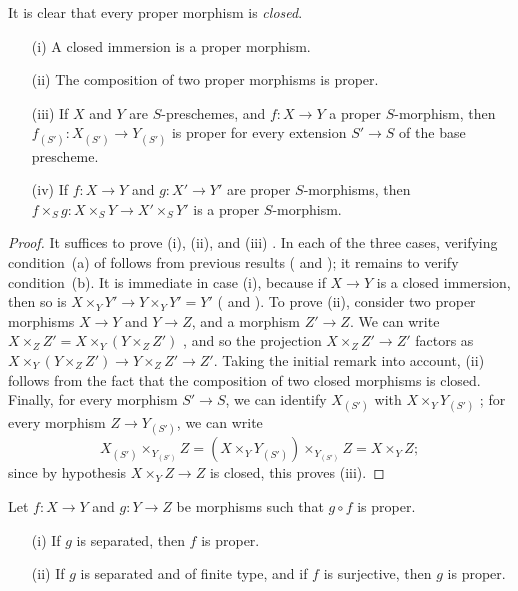 It is clear that every proper morphism is \emph{closed}.

\begin{proposition}[5.4.2]
\label{II.5.4.2}
\medskip\noindent
\begin{enumerate}
  \item[{\rm(i)}] A closed immersion is a proper morphism.
  \item[{\rm(ii)}] The composition of two proper morphisms is proper.
  \item[{\rm(iii)}] If $X$ and $Y$ are $S$-preschemes, and $f:X\to Y$ a proper $S$-morphism, then $f_{(S')}:X_{(S')}\to Y_{(S')}$ is proper for every extension $S'\to S$ of the base prescheme.
  \item[{\rm(iv)}] If $f:X\to Y$ and $g:X'\to Y'$ are proper $S$-morphisms, then $f\times_S g:X\times_S Y\to X'\times_S Y'$ is a proper $S$-morphism.
\end{enumerate}
\end{proposition}

\begin{proof}
It suffices to prove (i), (ii), and (iii) .
In each of the three cases, verifying condition~(a) of  follows from previous results ( and ); it remains to verify condition~(b).
It is immediate in case (i), because if $X\to Y$ is a closed immersion, then so is $X\times_Y Y'\to Y\times_Y Y'=Y'$ ( and ).
To prove (ii), consider two proper morphisms $X\to Y$ and $Y\to Z$, and a morphism $Z'\to Z$.
We can write $X\times_Z Z'=X\times_Y(Y\times_Z Z')$ , and so the projection $X\times_Z Z'\to Z'$ factors as $X\times_Y(Y\times_Z Z')\to Y\times_Z Z'\to Z'$.
Taking the initial remark into account, (ii) follows from the fact that the composition of two closed morphisms is closed.
Finally, for every morphism $S'\to S$, we can identify $X_{(S')}$ with $X\times_Y Y_{(S')}$ ; for every morphism $Z\to Y_{(S')}$, we can write
\[
  X_{(S')}\times_{Y_{(S')}}Z=(X\times_Y Y_{(S')})\times_{Y_{(S')}}Z=X\times_Y Z;
\]
since by hypothesis $X\times_Y Z\to Z$ is closed, this proves (iii).
\end{proof}

\begin{corollary}[5.4.3]
\label{II.5.4.3}
Let $f:X\to Y$ and $g:Y\to Z$ be morphisms such that $g\circ f$ is proper.
\begin{enumerate}
  \item[{\rm(i)}] If $g$ is separated, then $f$ is proper.
  \item[{\rm(ii)}] If $g$ is separated and of finite type, and if $f$ is surjective, then $g$ is proper.
\end{enumerate}
\end{corollary}

